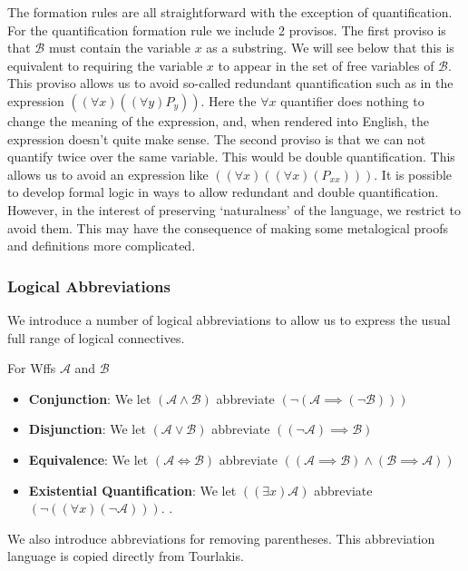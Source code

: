 \documentclass[12pt]{article}
\newcommand{\mc}[1]{\mathcal{#1}}
\begin{document}
\hrulefill

The formation rules are all straightforward with the exception of quantification.
For the quantification formation rule we include 2 provisos.
The first proviso is that $\mc{B}$ must contain the variable $x$ as a substring.
We will see below that this is equivalent to requiring the variable $x$ to appear in the set of free variables of $\mc{B}$.
This proviso allows us to avoid so-called redundant quantification such as in the expression $((\forall x)((\forall y) P_y))$.
Here the $\forall x$ quantifier does nothing to change the meaning of the expression, and, when rendered into English, the expression doesn't quite make sense.
The second proviso is that we can not quantify twice over the same variable.
This would be double quantification.
This allows us to avoid an expression like $((\forall x)((\forall x)(P_{xx})))$.
It is possible to develop formal logic in ways to allow redundant and double quantification.
However, in the interest of preserving `naturalness' of the language, we restrict to avoid them.
This may have the consequence of making some metalogical proofs and definitions more complicated.

\hrulefill

\subsubsection*{Logical Abbreviations}

We introduce a number of logical abbreviations to allow us to express the usual full range of logical connectives.

For Wffs $\mc{A}$ and $\mc{B}$
\begin{itemize}
\item{\textbf{Conjunction}: We let $(\mc{A} \land \mc{B})$ abbreviate $(\lnot(\mc{A} \implies (\lnot \mc{B})))$}
\item{\textbf{Disjunction}: We let $(\mc{A} \lor \mc{B})$ abbreviate $((\lnot \mc{A}) \implies \mc{B})$}
\item{\textbf{Equivalence}: We let $(\mc{A} \iff \mc{B})$ abbreviate $((\mc{A} \implies \mc{B}) \land (\mc{B} \implies \mc{A}))$}
\item{\textbf{Existential Quantification}: We let $((\exists x) \mc{A})$ abbreviate $(\lnot((\forall x)(\lnot \mc{A})))$. .}
\end{itemize}

We also introduce abbreviations for removing parentheses. 
This abbreviation language is copied directly from Tourlakis.
\end{document}
